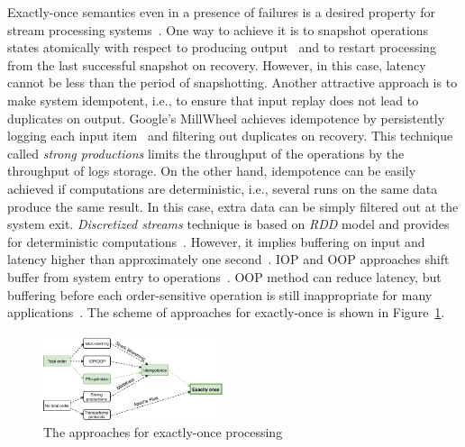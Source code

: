 \label {fs-short-intro}


Exactly-once semantics even in a presence of failures is a desired property for stream processing systems~\cite{Akidau:2013:MFS:2536222.2536229}. One way to achieve it is to snapshot operations states atomically with respect to producing output~\cite{Carbone:2017:SMA:3137765.3137777} and to restart processing from the last successful snapshot on recovery. However, in this case, latency cannot be less than the period of snapshotting. Another attractive approach is to make system idempotent, i.e., to ensure that input replay does not lead to duplicates on output. Google's MillWheel achieves idempotence by persistently logging each input item~\cite{Akidau:2013:MFS:2536222.2536229} and filtering out duplicates on recovery. This technique called {\em strong productions} limits the throughput of the operations by the throughput of logs storage. On the other hand, idempotence can be easily achieved if computations are deterministic, i.e., several runs on the same data produce the same result. In this case, extra data can be simply filtered out at the system exit. {\em Discretized streams} technique is based on {\em RDD} model and provides for deterministic computations~\cite{Zaharia:2012:DSE:2342763.2342773}. However, it implies buffering on input and latency higher than approximately one second~\cite{Qian:2013:TRS:2465351.2465353}. IOP and OOP approaches shift buffer from system entry to operations~\cite{Li:2008:OPN:1453856.1453890}. OOP method can reduce latency, but buffering before each order-sensitive operation is still inappropriate for many applications~\cite{Zacheilas:2017:MDS:3093742.3093921}. The scheme of approaches for exactly-once is shown in Figure~\ref{approaches}.

\begin{figure}[ht]
  \centering
  \includegraphics[width=0.47\textwidth]{pics/intro-approaches}
  \caption{The approaches for exactly-once processing}
  \label {approaches}
\end{figure}

